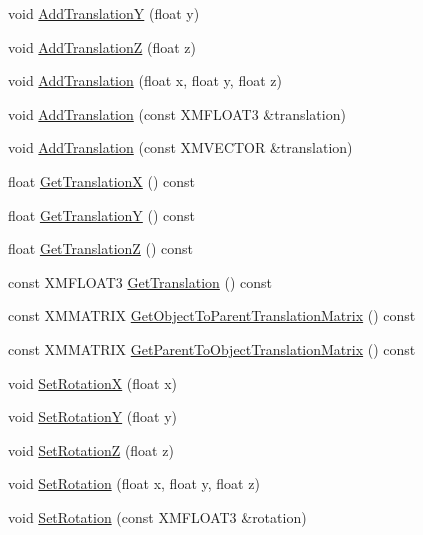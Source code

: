 \begin{DoxyCompactItemize}
\item 
void \hyperlink{classmage_1_1_transform_node_a84c2addddb05b0275a5d4150f343dd11}{Add\+TranslationY} (float y)
\item 
void \hyperlink{classmage_1_1_transform_node_a19aeee4f27b1af94d1626ae19dfe12b2}{Add\+TranslationZ} (float z)
\item 
void \hyperlink{classmage_1_1_transform_node_acd99ac8ba7379a3c8abcd02703aac4e3}{Add\+Translation} (float x, float y, float z)
\item 
void \hyperlink{classmage_1_1_transform_node_a2b9605c7e6db9f6a2805a1f5dfa9017f}{Add\+Translation} (const X\+M\+F\+L\+O\+A\+T3 \&translation)
\item 
void \hyperlink{classmage_1_1_transform_node_ae2f57eb9e02583900f865e80040279b4}{Add\+Translation} (const X\+M\+V\+E\+C\+T\+OR \&translation)
\item 
float \hyperlink{classmage_1_1_transform_node_a31b8818a43af8633136f345e30572723}{Get\+TranslationX} () const
\item 
float \hyperlink{classmage_1_1_transform_node_a0a4d107bb131f23f599ada568d10a330}{Get\+TranslationY} () const
\item 
float \hyperlink{classmage_1_1_transform_node_a0f7a78d289c16750e01ceefda0dea480}{Get\+TranslationZ} () const
\item 
const X\+M\+F\+L\+O\+A\+T3 \hyperlink{classmage_1_1_transform_node_a827c4ea5520141eb50866283acef95ad}{Get\+Translation} () const
\item 
const X\+M\+M\+A\+T\+R\+IX \hyperlink{classmage_1_1_transform_node_ad548d659067b5aa6bb0d76c073850179}{Get\+Object\+To\+Parent\+Translation\+Matrix} () const
\item 
const X\+M\+M\+A\+T\+R\+IX \hyperlink{classmage_1_1_transform_node_ae2d0f336a5567a585c15895da26ce0c6}{Get\+Parent\+To\+Object\+Translation\+Matrix} () const
\item 
void \hyperlink{classmage_1_1_transform_node_a7c67c5a3ce41a1a72e21a84aac5df688}{Set\+RotationX} (float x)
\item 
void \hyperlink{classmage_1_1_transform_node_a60188cf67c3d08f30c9d7c970351b8d3}{Set\+RotationY} (float y)
\item 
void \hyperlink{classmage_1_1_transform_node_a8977f1c3b822398e449d9042a5e3cee0}{Set\+RotationZ} (float z)
\item 
void \hyperlink{classmage_1_1_transform_node_a1f0f355c51e906eabc6aa2a17706ac50}{Set\+Rotation} (float x, float y, float z)
\item 
void \hyperlink{classmage_1_1_transform_node_ad963be51dc37adf84e1e4e19d8afc676}{Set\+Rotation} (const X\+M\+F\+L\+O\+A\+T3 \&rotation)

\end{DoxyCompactItemize}
